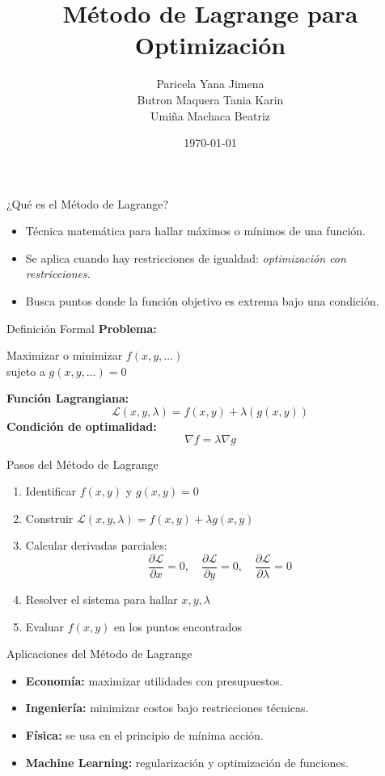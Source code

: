 \documentclass{beamer}
\title{Método de Lagrange para Optimización}
\author{Paricela Yana Jimena\\ Butron Maquera Tania Karin \\ Umiña Machaca Beatriz}
\date{\today}
\begin{document}
\frame{\titlepage}

\begin{frame}{¿Qué es el Método de Lagrange?}
\begin{itemize}
    \item Técnica matemática para hallar máximos o mínimos de una función.
    \item Se aplica cuando hay restricciones de igualdad: \textit{optimización con restricciones}.
    \item Busca puntos donde la función objetivo es extrema bajo una condición.
\end{itemize}
\end{frame}

\begin{frame}{Definición Formal}
\textbf{Problema:}
\begin{block}{}
Maximizar o minimizar $f(x, y, \dots)$ \\
sujeto a $g(x, y, \dots) = 0$
\end{block}

\textbf{Función Lagrangiana:}
\[
\mathcal{L}(x, y, \lambda) = f(x, y) + \lambda (g(x, y))
\]
\textbf{Condición de optimalidad:}
\[
\nabla f = \lambda \nabla g
\]
\end{frame}

\begin{frame}{Pasos del Método de Lagrange}
\begin{enumerate}
    \item Identificar $f(x, y)$ y $g(x, y) = 0$
    \item Construir $\mathcal{L}(x, y, \lambda) = f(x, y) + \lambda g(x, y)$
    \item Calcular derivadas parciales: 
    \[
    \frac{\partial \mathcal{L}}{\partial x} = 0,\quad \frac{\partial \mathcal{L}}{\partial y} = 0,\quad \frac{\partial \mathcal{L}}{\partial \lambda} = 0
    \]
    \item Resolver el sistema para hallar \( x, y, \lambda \)
    \item Evaluar \( f(x, y) \) en los puntos encontrados
\end{enumerate}
\end{frame}


\begin{frame}{Aplicaciones del Método de Lagrange}
\begin{itemize}
    \item \textbf{Economía:} maximizar utilidades con presupuestos.
    \item \textbf{Ingeniería:} minimizar costos bajo restricciones técnicas.
    \item \textbf{Física:} se usa en el principio de mínima acción.
    \item \textbf{Machine Learning:} regularización y optimización de funciones.
\end{itemize}
\end{frame}
\end{document}

